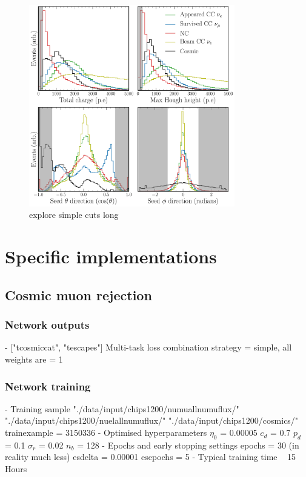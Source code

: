 \begin{figure} %
    \includegraphics[width=0.8\textwidth]{diagrams/6-cvn/chipsnet/explore_simple_cuts.pdf}
    \caption[explore simple cuts short]
    {explore simple cuts long}
    \label{fig:explore_simple_cuts}
\end{figure}

\section{Specific implementations} %
\label{sec:cvn_specific} %

\subsection{Cosmic muon rejection} %
\label{sec:cvn_specific_cosmic} %

\subsubsection*{Network outputs} %
- ["tcosmiccat", "tescapes"]
Multi-task loss combination strategy = simple, all weights are = 1
\subsubsection*{Network training} %
- Training sample
"./data/input/chips1200/numuallnumuflux/"
"./data/input/chips1200/nuelallnumuflux/"
"./data/input/chips1200/cosmics/"
trainexample = 3150336
- Optimised hyperparameters
$\eta_{0}$ = 0.00005
$c_{d}$ = 0.7
$p_{d}$ = 0.1
$\sigma_{r}$ = 0.02
$n_{b}$ = 128
- Epochs and early stopping settings
epochs = 30 (in reality much less)
esdelta = 0.00001
esepochs = 5
- Typical training time
~ 15 Hours
